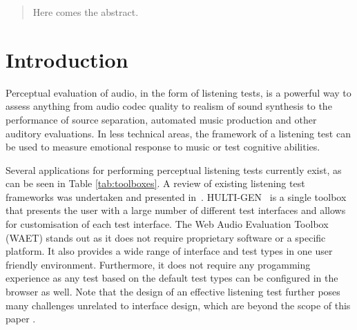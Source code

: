 \documentclass{sig-alternate}
\begin{document}
\maketitle
\begin{abstract}
Here comes the abstract. 
\end{abstract}


\section{Introduction}

	Perceptual evaluation of audio, in the form of listening tests, is a powerful way to assess anything from audio codec quality to realism of sound synthesis to the performance of source separation, automated music production and other auditory evaluations.
	In less technical areas, the framework of a listening test can be used to measure emotional response to music or test cognitive abilities. 


	Several applications for performing perceptual listening tests currently exist, as can be seen in Table \ref{tab:toolboxes}. A review of existing listening test frameworks was undertaken and presented in~. HULTI-GEN~\cite{hultigen} is a single toolbox that presents the user with a large number of different test interfaces and allows for customisation of each test interface. The Web Audio Evaluation Toolbox (WAET) stands out as it does not require proprietary software or a specific platform. It also provides a wide range of interface and test types in one user friendly environment. Furthermore, it does not require any progamming experience as any test based on the default test types can be configured in the browser as well. Note that the design of an effective listening test further poses many challenges unrelated to interface design, which are beyond the scope of this paper \cite{bech}. 
\end{document}

